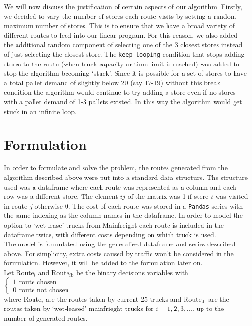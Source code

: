 \documentclass[11pt, a4paper]{article}   	%
\begin{document}
\noindent We will now discuss the justification of certain aspects of our algorithm. Firstly, we decided to vary the number of stores each route visits by setting a random maximum number of stores. This is to ensure that we have a broad variety of different routes to feed into our linear program. For this reason, we also added the additional random component of selecting one of the 3 closest stores instead of just selecting the closest store.  The \texttt{keep\_looping} condition that stops adding stores to the route (when truck capacity or time limit is reached)  was added to stop the algorithm becoming ‘stuck’. Since it is possible for a set of stores to have a total pallet demand of slightly below 20 (say 17-19) without this break condition the algorithm would continue to try adding a store even if no stores with a pallet demand of 1-3 pallets existed. In this way the algorithm would get stuck in an infinite loop.

\section{Formulation}
In order to formulate and solve the problem, the routes generated from the algorithm described above were put into a standard data structure. The structure used was a dataframe where each route was represented as a column and each row was a different store. The element $ij$ of the matrix was 1 if store $i$ was visited in route $j$ otherwise 0. The cost of each route was stored in a \texttt{Pandas} series with the same indexing as the column names in the dataframe. In order to model the option to ‘wet-lease’ trucks from Mainfreight each route is included in the dataframe twice, with different costs depending on which truck is used. \\

	\noindent 
	The model is formulated using the generalised dataframe and series described above. For simplicity, extra costs caused by traffic won’t be considered in the formulation. However, it will be added to the formulation later on. \\
	
	\noindent
	Let Route$_{i}$ and Route$_{i\text{b}}$ be the binary decisions variables with $\begin{cases}
		1: \text{route chosen}\\
		0: \text{route not chosen}
	\end{cases}$  \\
where Route$_{i}$ are the routes taken by current 25 trucks and Route$_{i\text{b}}$ are the routes taken by `wet-leased' mainfrieght trucks for $i=1,2,3,\dots$. up to the number of generated routes.\\
	
\end{document}
